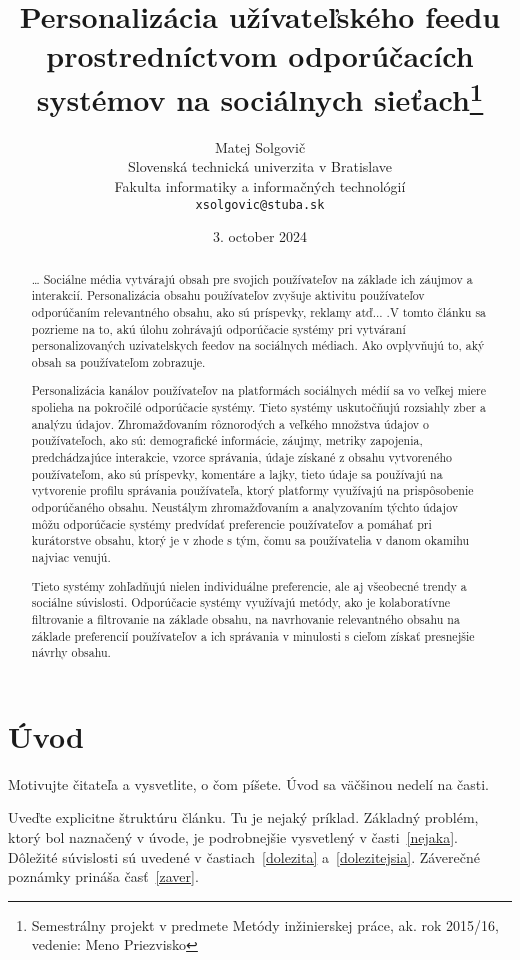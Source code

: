 \documentclass[10pt,twoside,slovak,a4paper]{article}
\title{Personalizácia užívateľského feedu prostredníctvom odporúčacích systémov na sociálnych sieťach\thanks{Semestrálny projekt v predmete Metódy inžinierskej práce, ak. rok 2015/16, vedenie: Meno Priezvisko}} %
\author{Matej Solgovič\\[2pt]
	{\small Slovenská technická univerzita v Bratislave}\\
	{\small Fakulta informatiky a informačných technológií}\\
	{\small \texttt{xsolgovic@stuba.sk}}
	}
\date{\small 3. october 2024} %
\begin{document}
\maketitle

\begin{abstract}
\ldots
Sociálne média vytvárajú obsah pre svojich používateľov na základe ich záujmov a interakcií. Personalizácia obsahu používateľov zvyšuje aktivitu používateľov odporúčaním relevantného obsahu, ako sú príspevky, reklamy atď... .V tomto článku sa pozrieme na to, akú úlohu zohrávajú odporúčacie systémy pri vytváraní personalizovaných  uzivatelskych feedov na sociálnych médiach. Ako ovplyvňujú to, aký obsah sa používateľom zobrazuje.

Personalizácia kanálov používateľov na platformách sociálnych médií sa vo veľkej miere spolieha na pokročilé odporúčacie systémy. Tieto systémy uskutočňujú rozsiahly zber a analýzu údajov. Zhromažďovaním rôznorodých a veľkého množstva údajov o používateľoch, ako sú: demografické informácie, záujmy, metriky zapojenia, predchádzajúce interakcie, vzorce správania, údaje získané z obsahu vytvoreného používateľom, ako sú príspevky, komentáre a lajky, tieto údaje sa používajú na vytvorenie profilu správania používateľa, ktorý platformy využívajú na prispôsobenie odporúčaného obsahu. Neustálym zhromažďovaním a analyzovaním týchto údajov môžu odporúčacie systémy predvídať preferencie používateľov a pomáhať pri kurátorstve obsahu, ktorý je v zhode s tým, čomu sa používatelia v danom okamihu najviac venujú.

Tieto systémy zohľadňujú nielen individuálne preferencie, ale aj všeobecné trendy a sociálne súvislosti. Odporúčacie systémy využívajú metódy, ako je kolaboratívne filtrovanie a filtrovanie na základe obsahu, na navrhovanie relevantného obsahu na základe preferencií používateľov a ich správania v minulosti s cieľom získať presnejšie návrhy obsahu. 
\end{abstract}



\section{Úvod}

Motivujte čitateľa a vysvetlite, o čom píšete. Úvod sa väčšinou nedelí na časti.

Uveďte explicitne štruktúru článku. Tu je nejaký príklad.
Základný problém, ktorý bol naznačený v úvode, je podrobnejšie vysvetlený v časti~\ref{nejaka}.
Dôležité súvislosti sú uvedené v častiach~\ref{dolezita} a~\ref{dolezitejsia}.
Záverečné poznámky prináša časť~\ref{zaver}.
\end{document}
